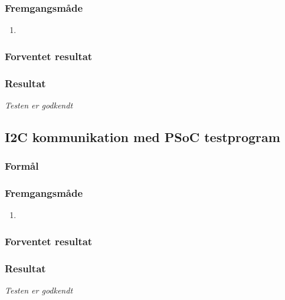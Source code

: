 \subsubsection*{Fremgangsmåde}
\begin{enumerate}
\item 

\end{enumerate}

\subsubsection*{Forventet resultat} 


\subsubsection*{Resultat} 


\textit{Testen er godkendt}

\subsection*{I2C kommunikation med PSoC testprogram}

\subsubsection*{Formål}

\subsubsection*{Fremgangsmåde}
\begin{enumerate}
\item 

\end{enumerate}

\subsubsection*{Forventet resultat} 


\subsubsection*{Resultat} 


\textit{Testen er godkendt}